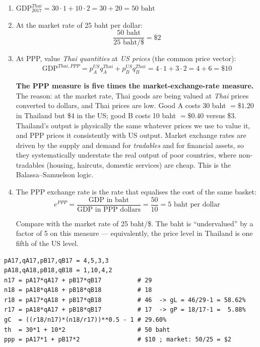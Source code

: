 \documentclass[12pt, letterpaper]{article}
\begin{document}
\begin{tcolorbox}[evenbox,title={Problem 1.2 \quad Comparisons Across Time and Across Countries}]
\begin{enumerate}
It sits between the two, as it must, and it is symmetric: it gives no privileged status to
either year's prices. This is why the BEA (and the IBGE) publish chained series.

\item $\text{GDP}^{Thai}_{2017} = 30\cdot 1 + 10\cdot 2 = 30 + 20 = \boxed{50 \text{ baht}}$ \checkmark

\item At the market rate of 25 baht per dollar:
$$\frac{50 \text{ baht}}{25 \text{ baht/\$}} = \boxed{\$2}$$ \checkmark

\item At PPP, value \emph{Thai quantities} at \emph{US prices} (the common price vector):
$$\text{GDP}^{Thai,PPP} = p_A^{US}q_A^{Thai} + p_B^{US}q_B^{Thai} = 4\cdot 1 + 3\cdot 2
= 4 + 6 = \boxed{\$10}$$ \checkmark

\textbf{The PPP measure is five times the market-exchange-rate measure.} The reason: at the
market rate, Thai goods are being valued at \emph{Thai} prices converted to dollars, and Thai
prices are low. Good A costs 30 baht $= \$1.20$ in Thailand but \$4 in the US; good B costs
10 baht $= \$0.40$ versus \$3. Thailand's output is physically the same whatever prices we
use to value it, and PPP prices it consistently with US output. Market exchange rates are
driven by the supply and demand for \emph{tradables} and for financial assets, so they
systematically understate the real output of poor countries, where non-tradables (housing,
haircuts, domestic services) are cheap. This is the Balassa--Samuelson logic.

\item The PPP exchange rate is the rate that equalises the cost of the same basket:
$$e^{PPP} = \frac{\text{GDP in baht}}{\text{GDP in PPP dollars}} = \frac{50}{10}
= \boxed{5 \text{ baht per dollar}}$$ \checkmark

Compare with the market rate of 25 baht/\$. The baht is ``undervalued'' by a factor of 5 on
this measure --- equivalently, the price level in Thailand is one fifth of the US level.
\end{enumerate}

\begin{tcolorbox}[theorybox,title={Verification code}]
\footnotesize
\begin{verbatim}
pA17,qA17,pB17,qB17 = 4,5,3,3
pA18,qA18,pB18,qB18 = 1,10,4,2
n17 = pA17*qA17 + pB17*qB17          # 29
n18 = pA18*qA18 + pB18*qB18          # 18
r18 = pA17*qA18 + pB17*qB18          # 46  -> gL = 46/29-1 = 58.62%
r17 = pA18*qA17 + pB18*qB17          # 17  -> gP = 18/17-1 =  5.88%
gC  = ((r18/n17)*(n18/r17))**0.5 - 1 # 29.60%
th  = 30*1 + 10*2                    # 50 baht
ppp = pA17*1 + pB17*2                # $10 ; market: 50/25 = $2
\end{verbatim}
\end{tcolorbox}
\end{tcolorbox}
\end{document}
